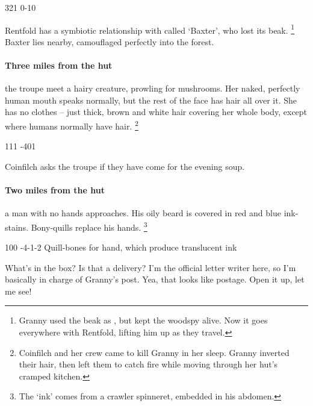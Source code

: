 \documentclass[10pt,twoside]{book}
\begin{document}
%
  {{3}{2}{1}}%
  {{0}{-1}{0}}%
  {%
  }%
  {}%
  {}%
  {\tentacles}%


Rentfold has a symbiotic relationship with  called `Baxter', who lost its beak.%
\footnote{Granny used the beak as , but kept the \gls{woodspy} alive.  Now it goes everywhere with Rentfold, lifting him up as they travel.}
Baxter lies nearby, camouflaged perfectly into the forest.

\paragraph{Three miles from the hut}
the troupe meet a hairy creature, prowling for mushrooms.
Her naked, perfectly human mouth speaks normally, but the rest of the face has hair all over it.
She has no clothes -- just thick, brown and white hair covering her whole body, except where humans normally have hair.%
\footnote{Coinfilch and her crew came to kill Granny in her sleep.
Granny inverted their hair, then left them to catch fire while moving through her hut's cramped kitchen.}

%
  {{1}{1}{1}}%
  {{-4}{0}{1}}%
  {%
  }%
  {}%
  {}%
  {\tentacles}%

Coinfilch asks the troupe if they have come for the evening soup.

\paragraph{Two miles from the hut}
a man with no hands approaches.
His oily beard is covered in red and blue ink-stains.
Bony-quills replace his hands.%
\footnote{The `ink' comes from a \gls{crawler} spinneret, embedded in his abdomen.}

%
  {{1}{0}{0}}%
  {{-4}{-1}{-2}}%
  {%
  }%
  {}%
  {}%
  {Quill-bones for hand, which produce translucent ink}%

\begin{speechtext}
  What's in the box?
  Is that a delivery?
  I'm the official letter writer here, so I'm basically in charge of Granny's post.
  Yea, that looks like postage.
  Open it up, let me see!
\end{speechtext}
\end{document}
